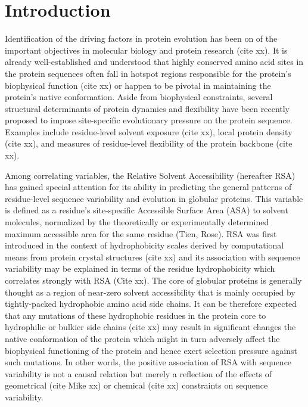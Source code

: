 \documentclass[preprint,12pt]{article}
\begin{document}
\section{Introduction\label{sec:Intro}}

    Identification of the driving factors in protein evolution has been on of the important objectives in molecular biology and protein research (cite xx). It is already well-established and understood that highly conserved amino acid sites in the protein sequences often fall in hotspot regions responsible for the protein's biophysical function (cite xx) or happen to be pivotal in maintaining the protein's native conformation. Aside from biophysical constraints, several structural determinants of protein dynamics and flexibility have been recently proposed to impose site-specific evolutionary pressure on the protein sequence. Examples include residue-level solvent exposure (cite xx), local protein density (cite xx), and measures of residue-level flexibility of the protein backbone (cite xx).

    Among correlating variables, the Relative Solvent Accessibility (hereafter RSA) has gained special attention for its ability in predicting the general patterns of residue-level sequence variability and evolution in globular proteins. This variable is defined as a residue's site-specific Accessible Surface Area (ASA) to solvent molecules, normalized by the theoretically or experimentally determined maximum accessible area for the same residue (Tien, Rose). RSA was first introduced in the context of hydrophobicity scales derived by computational means from protein crystal structures (cite xx) and its association with sequence variability may be explained in terms of the residue hydrophobicity which correlates strongly with RSA (Cite xx). The core of globular proteins is generally thought as a region of near-zero solvent accessibility that is mainly occupied by tightly-packed hydrophobic amino acid side chains. It can be therefore expected that any mutations of these hydrophobic residues in the protein core to hydrophilic or bulkier side chains (cite xx) may result in significant changes the native conformation of the protein which might in turn adversely affect the biophysical functioning of the protein and hence exert selection pressure against such mutations. In other words, the positive association of RSA with sequence variability is not a causal relation but merely a reflection of the effects of geometrical (cite Mike xx) or chemical (cite xx) constraints on sequence variability.
\end{document}
